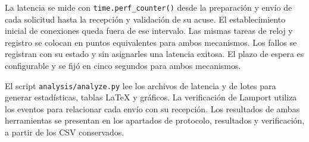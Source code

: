 La latencia se mide con \texttt{time.perf\_counter()} desde la preparación y envío
de cada solicitud hasta la recepción y validación de su acuse. El establecimiento
inicial de conexiones queda fuera de ese intervalo. Las mismas tareas de reloj
y registro se colocan en puntos equivalentes para ambos mecanismos. Los fallos
se registran con su estado y sin asignarles una latencia exitosa. El plazo de
espera es configurable y se fijó en cinco segundos para ambos mecanismos.

El script \texttt{analysis/analyze.py} lee los archivos
de latencia y de lotes para generar estadísticas, tablas LaTeX y gráficos.
La verificación de Lamport utiliza los eventos para relacionar cada envío con su
recepción. Los resultados de ambas herramientas se presentan en los apartados
de protocolo, resultados y verificación, a partir de los CSV conservados.
